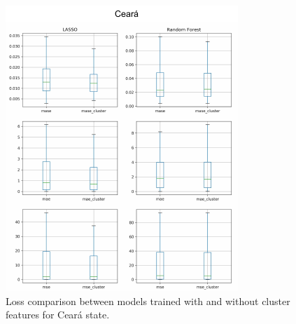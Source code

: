 \documentclass[12pt]{report}
\begin{document}
\begin{figure}[!ht]
\centering
\includegraphics[width=\textwidth]{cluster_model_compar_CE.pdf}
\caption{Loss comparison between models trained with and without cluster features for Ceará state.}
\label{fig:cluster_compar_ce}
\end{figure}
\end{document}

